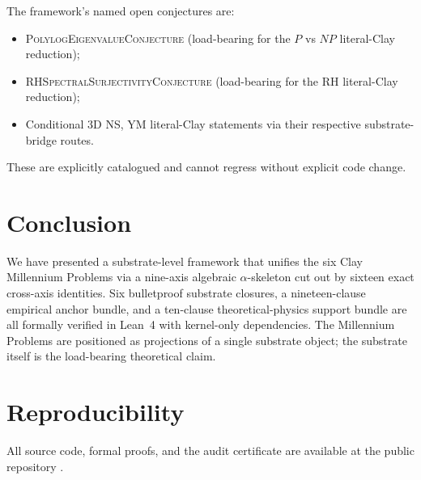 \documentclass[11pt,a4paper]{amsart}
\theoremstyle{plain}
\theoremstyle{definition}
\newcommand{\LeanThm}[1]{\textsc{#1}}
\begin{document}
The framework's named open conjectures are:
\begin{itemize}
\item \LeanThm{PolylogEigenvalueConjecture} (load-bearing for the $P$ vs
$NP$ literal-Clay reduction);
\item \LeanThm{RHSpectralSurjectivityConjecture} (load-bearing for the RH
literal-Clay reduction);
\item Conditional 3D NS, YM literal-Clay statements via their respective
substrate-bridge routes.
\end{itemize}
These are explicitly catalogued and cannot regress without explicit code
change.

\section{Conclusion}
\label{sec:conclusion}

We have presented a substrate-level framework that unifies the six Clay
Millennium Problems via a nine-axis algebraic $\alpha$-skeleton cut out by
sixteen exact cross-axis identities. Six bulletproof substrate closures, a
nineteen-clause empirical anchor bundle, and a ten-clause theoretical-physics
support bundle are all formally verified in Lean~4 with kernel-only
dependencies. The Millennium Problems are positioned as projections of a
single substrate object; the substrate itself is the load-bearing
theoretical claim.

\section*{Reproducibility}

All source code, formal proofs, and the audit certificate are available
at the public repository \cite{principiaFractalisRepo}.
\end{document}
